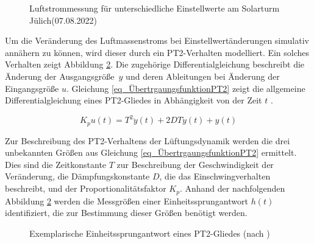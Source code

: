 \begin{figure}[h!]
    \centering
    \setlength{\fboxsep}{1pt}
    \setlength{\fboxrule}{1pt}
\caption[Luftstrommessung für unterschiedliche Einstellwerte am Solarturm Jülich\linebreak (07.08.2022)]{Luftstrommessung für unterschiedliche Einstellwerte am Solarturm Jülich\linebreak (07.08.2022)}
    \label{fig_LuftstromSolarturm}
\end{figure}

Um die Veränderung des Luftmassenstroms bei Einstellwertänderungen simulativ annähern zu können, wird dieser durch ein PT2-Verhalten modelliert.
Ein solches Verhalten zeigt Abbildung \ref{fig_SprungantwortSymbolisch}.
Die zugehörige Differentialgleichung beschreibt die Änderung der Ausgangsgröße~$y$ und deren Ableitungen bei Änderung der Eingangsgröße $u$.
Gleichung \ref{eq_ÜbertrgaungsfunktionPT2} zeigt die allgemeine Differentialgleichung eines PT2-Gliedes in Abhängigkeit von der Zeit $t$ \cite[S.200]{Lunze}\cite[S.60]{ProfMueller}.

\begin{equation} \label{eq_ÜbertrgaungsfunktionPT2}
K_p u(t) = T^2 \ddot{y}(t)+2 D T \dot{y}(t)+y(t)
\end{equation}

Zur Beschreibung des PT2-Verhaltens der Lüftungsdynamik werden die drei unbekannten Größen aus Gleichung \ref{eq_ÜbertrgaungsfunktionPT2} ermittelt.
Dies sind die Zeitkonstante $T$ zur Beschreibung der Geschwindigkeit der Veränderung, die Dämpfungskonstante $D$, die das Einschwingverhalten beschreibt, und der Proportionalitätsfaktor $K_p$.
Anhand der nachfolgenden Abbildung \ref{fig_SprungantwortSymbolisch} werden die Messgrößen einer Einheitssprungantwort $h(t)$ identifiziert, die zur Bestimmung dieser Größen benötigt werden.

\begin{figure}[h!]
    \centering
    \setlength{\fboxsep}{1pt}
    \setlength{\fboxrule}{1pt}
    \caption[Exemplarische Einheitssprungantwort eines PT2-Gliedes]{Exemplarische Einheitssprungantwort eines PT2-Gliedes (nach \cite[S.60]{ProfMueller})}
    \label{fig_SprungantwortSymbolisch}
\end{figure}


